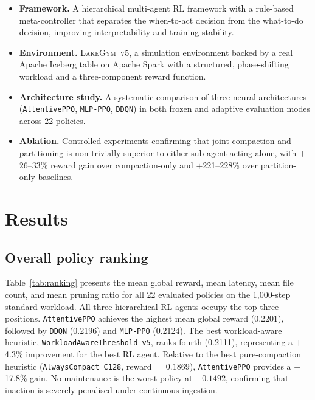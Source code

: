 \documentclass[fleqn,10pt]{wlscirep}
\newcommand{\env}{\textsc{LakeGym~v5}}
\newcommand{\attentive}{\texttt{AttentivePPO}}
\newcommand{\mlpppo}{\texttt{MLP-PPO}}
\newcommand{\ddqn}{\texttt{DDQN}}
\begin{document}
\begin{itemize}
\item \textbf{Framework.} A hierarchical multi-agent RL framework with
  a rule-based meta-controller that separates the when-to-act decision
  from the what-to-do decision, improving interpretability and training
  stability.

\item \textbf{Environment.} \env{}, a simulation environment backed by
  a real Apache Iceberg table on Apache Spark with a structured,
  phase-shifting workload and a three-component reward function.

\item \textbf{Architecture study.} A systematic comparison of three
  neural architectures (\attentive{}, \mlpppo{}, \ddqn{}) in both
  frozen and adaptive evaluation modes across 22 policies.

\item \textbf{Ablation.} Controlled experiments confirming that joint
  compaction and partitioning is non-trivially superior to either
  sub-agent acting alone, with $+$26--33\% reward gain over
  compaction-only and $+$221--228\% over partition-only baselines.
\end{itemize}

\FloatBarrier

\section*{Results}
\label{sec:results}

\subsection*{Overall policy ranking}

Table~\ref{tab:ranking} presents the mean global reward, mean latency,
mean file count, and mean pruning ratio for all 22 evaluated policies
on the 1,000-step standard workload.
All three hierarchical RL agents occupy the top three positions.
\attentive{} achieves the highest mean global reward (0.2201), followed
by \ddqn{} (0.2196) and \mlpppo{} (0.2124).
The best workload-aware heuristic,
\texttt{WorkloadAwareThreshold\_v5}, ranks fourth (0.2111),
representing a $+$4.3\% improvement for the best RL agent.
Relative to the best pure-compaction heuristic
(\texttt{AlwaysCompact\_C128}, reward $= 0.1869$), \attentive{}
provides a $+$17.8\% gain.
No-maintenance is the worst policy at $-0.1492$, confirming that
inaction is severely penalised under continuous ingestion.
\end{document}
